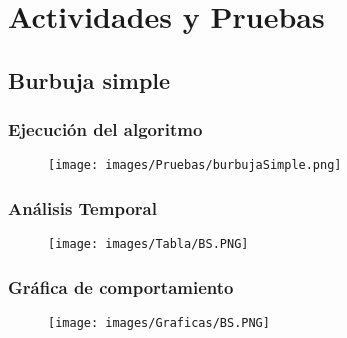 \documentclass[12pt]{article}
\begin{document}
	\section{Actividades y Pruebas}
	
		\subsection{Burbuja simple}
    		\subsubsection{Ejecución del algoritmo}
    		    \begin{figure}[H]
        	            \centering
        	             \texttt{[image: images/Pruebas/burbujaSimple.png]}
                \end{figure}
                
    		\subsubsection{Análisis Temporal}
    		    \begin{figure}[H]
        	            \centering
        	             \texttt{[image: images/Tabla/BS.PNG]}
                \end{figure}
                
    		\subsubsection{Gráfica de comportamiento}
    		    \begin{figure}[H]
        	            \centering
        	             \texttt{[image: images/Graficas/BS.PNG]}
                \end{figure}
            
    		\newpage
\end{document}
